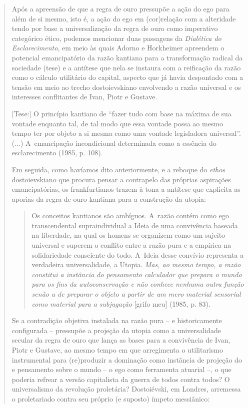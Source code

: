 {\begin{quote}
Após a apreensão de que a regra de ouro pressupõe a ação do ego para
além de si mesmo, isto é, a ação do ego em (cor)relação com a alteridade
tendo por base a universalização da regra de ouro como imperativo
categórico ético, podemos mencionar duas passagens da \emph{Dialética do
Esclarecimento}, em meio às quais Adorno e Horkheimer apreendem o
potencial emancipatório da razão kantiana para a transformação radical
da sociedade (tese) e a antítese que nela se instaura com a reificação
da razão como o cálculo utilitário do capital, aspecto que já havia
despontado com a tensão em meio ao trecho dostoievskiano envolvendo a
razão universal e os interesses conflitantes de Ivan, Piotr e Gustave.

{[}Tese:{]} O princípio kantiano de ``fazer tudo com base na máxima de
sua vontade enquanto tal, de tal modo que essa vontade possa ao mesmo
tempo ter por objeto a si mesma como uma vontade legisladora
universal''. (...) A~emancipação incondicional determinada como a
essência do esclarecimento (1985, p. 108).

Em seguida, como havíamos dito anteriormente, e a reboque do
\emph{ethos} dostoievskiano que procura pensar a contrapelo das próprias
aspirações emancipatórias, os frankfurtianos trazem à tona a antítese
que explicita as aporias da regra de ouro kantiana para a construção da
utopia:

\begin{quote}
Os conceitos kantianos são ambíguos. A~razão contém como ego
transcendental supraindividual a Ideia de uma convivência baseada na
liberdade, na qual os homens se organizem como um sujeito universal e
superem o conflito entre a razão pura e a empírica na solidariedade
consciente do todo. A~Ideia desse convívio representa a verdadeira
universalidade, a Utopia. \emph{Mas, ao mesmo tempo, a razão constitui a
instância do pensamento calculador que prepara o mundo para os fins da
autoconservação e não conhece nenhuma outra função senão a de preparar o
objeto a partir de um mero material sensorial como material para a
subjugação} {[}grifo meu{]} (1985, p. 83).
\end{quote}

Se a contradição objetiva instalada na razão pura -- e historicamente
configurada -- pressupõe a projeção da utopia como a universalidade
secular da regra de ouro que lança as bases para a convivência de Ivan,
Piotr e Gustave, ao mesmo tempo em que arregimenta o utilitarismo
instrumental para (re)produzir a dominação como instância de projeção do
e pensamento sobre o mundo -- o ego como ferramenta atuarial --, o que
poderia refrear a versão capitalista da guerra de todos contra todos? O
universalismo da revolução proletária? Dostoiévski, em Londres,
arremessa o proletariado contra seu próprio (e suposto) ímpeto
messiânico:


\end{quote}}
